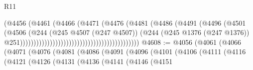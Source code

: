 \begin{lexlean}{R11}
\begin{coremodule}
                                                                  (@4456
                                                                    (@4461
                                                                      (@4466
                                                                        (@4471
                                                                          (@4476
                                                                            (@4481
                                                                              (@4486
                                                                                (@4491
                                                                                  (@4496
                                                                                    (@4501
                                                                                      (@4506
                                                                                        (@244
                                                                                          (@245
                                                                                            @4507
                                                                                            (@247
                                                                                              @4507))
                                                                                          (@244
                                                                                            (@245
                                                                                              @1376
                                                                                              (@247
                                                                                                @1376))
                                                                                            @251))))))))))))))))))))))))))))))))))))))))))))
@4608 := @4056
    (@4061
      (@4066
        (@4071
          (@4076
            (@4081
              (@4086
                (@4091
                  (@4096
                    (@4101
                      (@4106
                        (@4111
                          (@4116
                            (@4121
                              (@4126
                                (@4131
                                  (@4136
                                    (@4141
                                      (@4146
                                        (@4151

\end{coremodule}
\end{lexlean}
